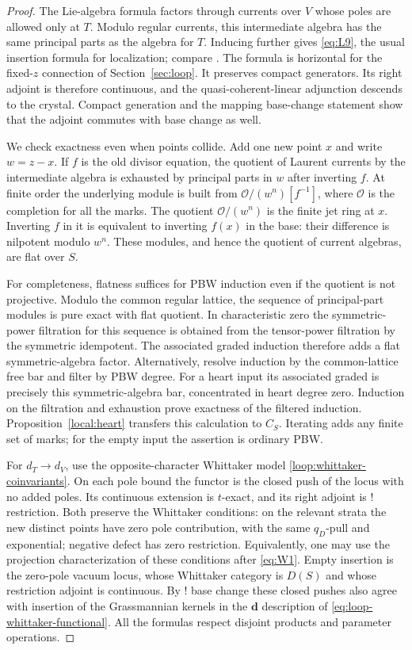 \begin{proof}
The Lie-algebra formula factors through currents over $V$ whose
poles are allowed only at $T$.  Modulo regular currents, this
intermediate algebra has the same principal parts as the algebra
for $T$.  Inducing further gives \eqref{eq:L9}, the usual insertion
formula for localization; compare \cite{GLCII}.  The formula is
horizontal for the fixed-$z$ connection of
Section~\ref{sec:loop}.  It preserves compact generators.  Its
right adjoint is therefore continuous, and the quasi-coherent-linear
adjunction descends to the crystal.  Compact generation and the
mapping base-change statement show that the adjoint commutes with
base change as well.

We check exactness even when points collide.  Add one new point $x$
and write $w=z-x$.  If $f$ is the old divisor equation, the quotient
of Laurent currents by the intermediate algebra is exhausted by
principal parts in $w$ after inverting $f$.  At finite order the
underlying module is built from
$\mathcal O/(w^n)[f^{-1}]$, where $\mathcal O$ is the completion
for all the marks.  The quotient $\mathcal O/(w^n)$ is the finite
jet ring at $x$.  Inverting $f$ in it is equivalent to inverting
$f(x)$ in the base: their difference is nilpotent modulo $w^n$.
These modules, and hence the quotient of current algebras, are flat
over $S$.

For completeness, flatness suffices for PBW induction even if the
quotient is not projective.  Modulo the common regular lattice, the
sequence of principal-part modules is pure exact with flat quotient.
In characteristic zero the symmetric-power filtration for this
sequence is obtained from the tensor-power filtration by the
symmetric idempotent.  The associated graded induction therefore
adds a flat symmetric-algebra factor.  Alternatively, resolve
induction by the common-lattice free bar and filter by PBW degree.
For a heart input its associated graded is precisely this
symmetric-algebra bar, concentrated in heart degree zero.
Induction on the filtration and exhaustion prove exactness of the
filtered induction.  Proposition~\ref{local:heart} transfers this
calculation to $C_S$.  Iterating adds any finite set of marks;
for the empty input the assertion is ordinary PBW.

For $d_T\to d_V$, use the opposite-character Whittaker model
\eqref{loop:whittaker-coinvariants}.  On each pole bound the functor is the closed push
of the locus with no added poles.  Its continuous extension is
$t$-exact, and its right adjoint is ! restriction.  Both preserve
the Whittaker conditions: on the relevant strata the new distinct
points have zero pole contribution, with the same $q_D$-pull and
exponential; negative defect has zero restriction.  Equivalently,
one may use the projection characterization of these conditions
after \eqref{eq:W1}.  Empty insertion is the zero-pole vacuum
locus, whose Whittaker category is $D(S)$ and whose restriction
adjoint is continuous.  By ! base change these closed pushes also
agree with insertion of the Grassmannian kernels in the
$\mathbf d$ description of \eqref{eq:loop-whittaker-functional}.  All the formulas
respect disjoint products and parameter operations.
\end{proof}

